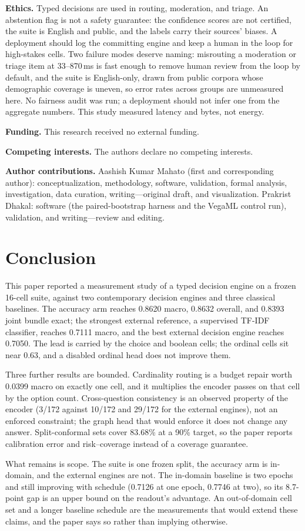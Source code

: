\textbf{Ethics.}
Typed decisions are used in routing, moderation, and triage. An abstention flag is not a safety
guarantee: the confidence scores are not certified, the suite is English and public, and the labels
carry their sources' biases. A deployment should log the committing engine and keep a human in the
loop for high-stakes cells. Two failure modes deserve naming: misrouting a moderation or triage
item at 33--870\,ms is fast enough to remove human review from the loop by default, and the suite is
English-only, drawn from public corpora whose demographic coverage is uneven, so error rates across
groups are unmeasured here. No fairness audit was run; a deployment should not infer one from the
aggregate numbers. This study measured latency and bytes, not energy.

\textbf{Funding.} This research received no external funding.

\textbf{Competing interests.} The authors declare no competing interests.

\textbf{Author contributions.} Aashish Kumar Mahato (first and corresponding author):
conceptualization, methodology, software,
validation, formal analysis, investigation, data curation, writing---original draft, and
visualization. Prakrist Dhakal: software (the paired-bootstrap harness and the VegaML control
run), validation, and writing---review and editing.

\section{Conclusion}
\label{sec:conclusion}

This paper reported a measurement study of a typed decision engine on a frozen 16-cell suite,
against two contemporary decision engines and three classical baselines. The accuracy arm reaches
0.8620 macro, 0.8632 overall, and 0.8393 joint bundle exact; the strongest external reference, a
supervised TF-IDF classifier, reaches 0.7111 macro, and the best external decision engine reaches
0.7050. The lead is carried by the choice and boolean cells; the ordinal cells sit near 0.63, and a
disabled ordinal head does not improve them.

Three further results are bounded. Cardinality routing is a budget repair worth 0.0399 macro on
exactly one cell, and it multiplies the encoder passes on that cell by the option count.
Cross-question consistency is an observed property of the encoder (3/172 against 10/172 and 29/172
for the external engines), not an enforced constraint; the graph head that would enforce it does not
change any answer. Split-conformal sets cover 83.68\% at a 90\% target, so the paper reports
calibration error and risk--coverage instead of a coverage guarantee.

What remains is scope. The suite is one frozen split, the accuracy arm is in-domain, and the
external engines are not. The in-domain baseline is two epochs and still improving with schedule
(0.7126 at one epoch, 0.7746 at two), so its 8.7-point gap is an upper bound on the readout's
advantage. An out-of-domain cell set and a longer baseline schedule are the measurements that would
extend these claims, and the paper says so rather than implying otherwise.
